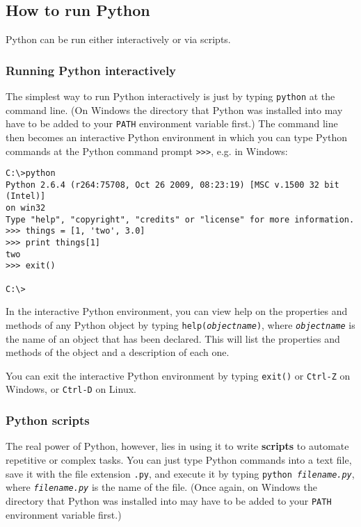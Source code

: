 \subsection{How to run Python}

Python can be run either interactively or via scripts.

\subsubsection{Running Python interactively}
\label{python_interactive}

The simplest way to run Python interactively is just by typing \texttt{python} at the command line.  (On Windows the directory that Python was installed into may have to be added to your \texttt{PATH} environment variable first.) The command line then becomes an interactive Python environment in which you can type Python commands at the Python command prompt \texttt{>>>}, e.g. in Windows:

\begin{verbatim}
C:\>python
Python 2.6.4 (r264:75708, Oct 26 2009, 08:23:19) [MSC v.1500 32 bit (Intel)]
on win32
Type "help", "copyright", "credits" or "license" for more information.
>>> things = [1, 'two', 3.0]
>>> print things[1]
two
>>> exit()

C:\>
\end{verbatim}

In the interactive Python environment, you can view help on the properties and methods of any Python object by typing \texttt{help(\emph{objectname})}, where \texttt{\emph{objectname}} is the name of an object that has been declared.  This will list the properties and methods of the object and a description of each one.

You can exit the interactive Python environment by typing \texttt{exit()} or \texttt{Ctrl-Z} on Windows, or \texttt{Ctrl-D} on Linux.

\subsubsection{Python scripts}

The real power of Python, however, lies in using it to write \textbf{scripts} to automate repetitive or complex tasks.  You can just type Python commands into a text file, save it with the file extension \texttt{.py}, and execute it by typing \texttt{python \emph{filename.py}}, where \texttt{\emph{filename.py}} is the name of the file.  (Once again, on Windows the directory that Python was installed into may have to be added to your \texttt{PATH} environment variable first.)

